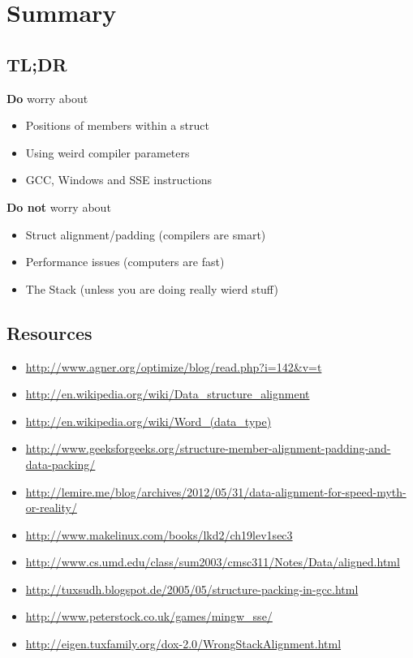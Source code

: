 \documentclass{beamer}
\begin{document}
\section{Summary}
\subsection{TL;DR}
\begin{frame}{\insertsection}{\insertsubsection}
    \begin{block}{\textbf{Do} worry about}
        \begin{itemize}
            \item Positions of members within a struct
            \item Using weird compiler parameters
            \item GCC, Windows and SSE instructions
        \end{itemize}
    \end{block}
    \pause
    \begin{block}{\textbf{Do not} worry about}
        \begin{itemize}
            \item Struct alignment/padding (compilers are smart)
            \item Performance issues (computers are fast)
            \item The Stack (unless you are doing really wierd stuff)
        \end{itemize}
    \end{block}
\end{frame}

\subsection{Resources}
\begin{frame}{\insertsection}{\insertsubsection}
	\begin{itemize}
        \tiny
        \item \url{http://www.agner.org/optimize/blog/read.php?i=142&v=t}
        \item \url{http://en.wikipedia.org/wiki/Data_structure_alignment}
        \item \url{http://en.wikipedia.org/wiki/Word_(data_type)}
        \item \url{http://www.geeksforgeeks.org/structure-member-alignment-padding-and-data-packing/}
        \item \url{http://lemire.me/blog/archives/2012/05/31/data-alignment-for-speed-myth-or-reality/}
        \item \url{http://www.makelinux.com/books/lkd2/ch19lev1sec3}
        \item \url{http://www.cs.umd.edu/class/sum2003/cmsc311/Notes/Data/aligned.html}
        \item \url{http://tuxsudh.blogspot.de/2005/05/structure-packing-in-gcc.html}
        \item \url{http://www.peterstock.co.uk/games/mingw_sse/}
        \item \url{http://eigen.tuxfamily.org/dox-2.0/WrongStackAlignment.html}
	\end{itemize}
\end{frame}
\end{document}
